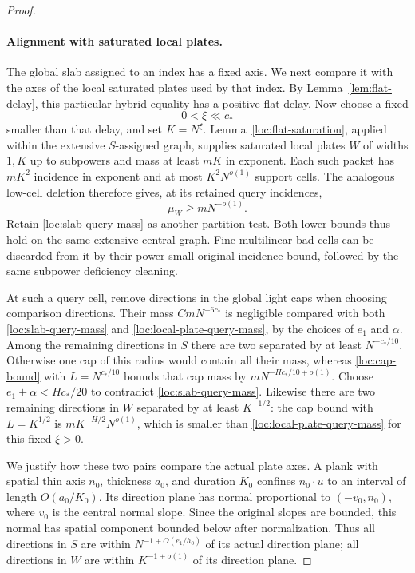 \begin{proof}
\paragraph{Alignment with saturated local plates.}
The global slab assigned to an index has a fixed axis.  We next
compare it with the axes of the local saturated plates used by that
index.  By Lemma~\ref{lem:flat-delay}, this particular hybrid
equality has a positive flat delay.  Now choose a fixed
\[
 0<\xi\ll c_*
\]
smaller than that delay, and set $K=N^\xi$.
Lemma~\ref{loc:flat-saturation}, applied within the extensive
$S$-assigned graph, supplies saturated local plates $W$ of
widths $1,K$ up to subpowers and mass at least $mK$ in exponent.
Each such packet has $mK^2$ incidence in exponent and at most
$K^2N^{o(1)}$ support cells.  The analogous low-cell deletion
therefore gives, at its retained query incidences,
\begin{equation}
 \mu_W\geq mN^{-o(1)}.
 \label{loc:local-plate-query-mass}
\end{equation}
Retain \eqref{loc:slab-query-mass} as another partition test.
Both lower bounds thus hold on the same extensive central graph.
Fine multilinear bad cells can be discarded from it by their
power-small original incidence bound, followed by the same
subpower deficiency cleaning.

At such a query cell, remove directions in the global light caps
when choosing comparison directions.  Their mass
$CmN^{-6c_*}$ is negligible compared with both
\eqref{loc:slab-query-mass} and
\eqref{loc:local-plate-query-mass}, by the choices of $e_1$ and
$\alpha$.  Among the remaining directions in $S$ there are two
separated by at least $N^{-c_*/10}$.  Otherwise one cap of this
radius would contain all their mass, whereas
\eqref{loc:cap-bound} with $L=N^{c_*/10}$ bounds that cap mass
by $mN^{-Hc_*/10+o(1)}$.  Choose
$e_1+\alpha<Hc_*/20$ to contradict
\eqref{loc:slab-query-mass}.  Likewise there are two remaining
directions in $W$ separated by at least $K^{-1/2}$: the cap
bound with $L=K^{1/2}$ is $mK^{-H/2}N^{o(1)}$, which is smaller
than \eqref{loc:local-plate-query-mass} for this fixed $\xi>0$.

We justify how these two pairs compare the actual plate axes.
A plank with spatial thin axis $n_0$, thickness $a_0$, and
duration $K_0$ confines $n_0\cdot u$ to an interval of length
$O(a_0/K_0)$.  Its direction plane has normal proportional to
$(-v_0,n_0)$, where $v_0$ is the central normal slope.  Since
the original slopes are bounded, this normal has spatial
component bounded below after normalization.  Thus all directions
in $S$ are within
$N^{-1+O(e_1/h_0)}$ of its actual direction plane; all directions
in $W$ are within $K^{-1+o(1)}$ of its direction plane.


\end{proof}
